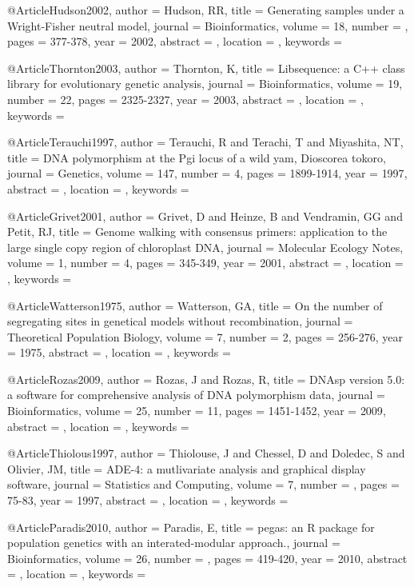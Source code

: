 @Article{Hudson2002,
author = {Hudson, RR}, 
title = {Generating samples under a Wright-Fisher neutral model}, 
journal = {Bioinformatics}, 
volume = {18}, 
number = {}, 
pages = {377-378}, 
year = {2002}, 
abstract = {}, 
location = {}, 
keywords = {}}


@Article{Thornton2003,
author = {Thornton, K}, 
title = {Libsequence: a C++ class library for evolutionary genetic analysis}, 
journal = {Bioinformatics}, 
volume = {19}, 
number = {22}, 
pages = {2325-2327}, 
year = {2003}, 
abstract = {}, 
location = {}, 
keywords = {}}


@Article{Terauchi1997,
author = {Terauchi, R and Terachi, T and Miyashita, NT}, 
title = {DNA polymorphism at the Pgi locus of a wild yam, Dioscorea tokoro}, 
journal = {Genetics}, 
volume = {147}, 
number = {4}, 
pages = {1899-1914}, 
year = {1997}, 
abstract = {}, 
location = {}, 
keywords = {}}


@Article{Grivet2001,
author = {Grivet, D and Heinze, B and Vendramin, GG and Petit, RJ}, 
title = {Genome walking with consensus primers: application to the large single copy region of chloroplast DNA}, 
journal = {Molecular Ecology Notes}, 
volume = {1}, 
number = {4}, 
pages = {345-349}, 
year = {2001}, 
abstract = {}, 
location = {}, 
keywords = {}}


@Article{Watterson1975,
author = {Watterson, GA}, 
title = {On the number of segregating sites in genetical models without recombination}, 
journal = {Theoretical Population Biology}, 
volume = {7}, 
number = {2}, 
pages = {256-276}, 
year = {1975}, 
abstract = {}, 
location = {}, 
keywords = {}}


@Article{Rozas2009,
author = {Rozas, J and Rozas, R}, 
title = {DNAsp version 5.0: a software for comprehensive analysis of DNA polymorphism data}, 
journal = {Bioinformatics}, 
volume = {25}, 
number = {11}, 
pages = {1451-1452}, 
year = {2009}, 
abstract = {}, 
location = {}, 
keywords = {}}


@Article{Thiolous1997,
author = {Thiolouse, J and Chessel, D and Doledec, S and Olivier, JM}, 
title = {ADE-4: a mutlivariate analysis and graphical display software}, 
journal = {Statistics and Computing}, 
volume = {7}, 
number = {}, 
pages = {75-83}, 
year = {1997}, 
abstract = {}, 
location = {}, 
keywords = {}}


@Article{Paradis2010,
author = {Paradis, E}, 
title = {pegas: an R package for population genetics with an interated-modular approach.}, 
journal = {Bioinformatics}, 
volume = {26}, 
number = {}, 
pages = {419-420}, 
year = {2010}, 
abstract = {}, 
location = {}, 
keywords = {}}


